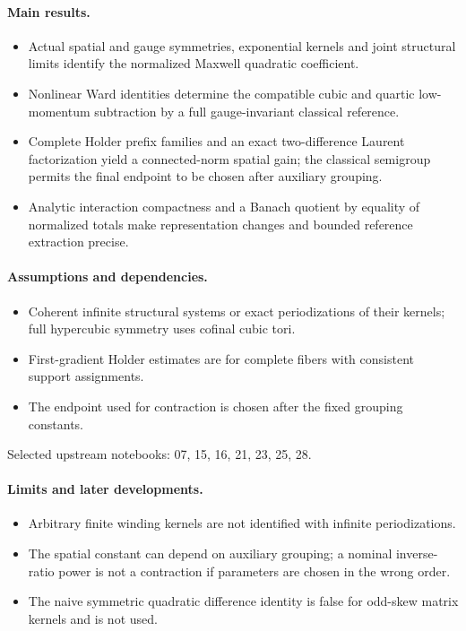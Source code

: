 \documentclass[11pt]{article}
\theoremstyle{remark}
\begin{document}
\paragraph{Main results.}
\begin{itemize}
\item Actual spatial and gauge symmetries, exponential kernels and joint structural limits identify the normalized Maxwell quadratic coefficient.
\item Nonlinear Ward identities determine the compatible cubic and quartic low-momentum subtraction by a full gauge-invariant classical reference.
\item Complete Holder prefix families and an exact two-difference Laurent factorization yield a connected-norm spatial gain; the classical semigroup permits the final endpoint to be chosen after auxiliary grouping.
\item Analytic interaction compactness and a Banach quotient by equality of normalized totals make representation changes and bounded reference extraction precise.
\end{itemize}

\paragraph{Assumptions and dependencies.}
\begin{itemize}
\item Coherent infinite structural systems or exact periodizations of their kernels; full hypercubic symmetry uses cofinal cubic tori.
\item First-gradient Holder estimates are for complete fibers with consistent support assignments.
\item The endpoint used for contraction is chosen after the fixed grouping constants.
\end{itemize}

Selected upstream notebooks: 07, 15, 16, 21, 23, 25, 28.\par

\paragraph{Limits and later developments.}
\begin{itemize}
\item Arbitrary finite winding kernels are not identified with infinite periodizations.
\item The spatial constant can depend on auxiliary grouping; a nominal inverse-ratio power is not a contraction if parameters are chosen in the wrong order.
\item The naive symmetric quadratic difference identity is false for odd-skew matrix kernels and is not used.
\end{itemize}
\end{document}
